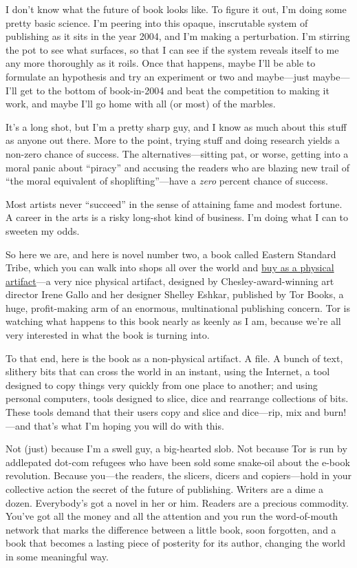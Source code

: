 I don’t know what the future of book looks like. To figure it out,
I’m doing some pretty basic science. I’m peering into this opaque,
inscrutable system of publishing as it sits in the year 2004, and
I’m making a perturbation. I’m stirring the pot to see what
surfaces, so that I can see if the system reveals itself to me any
more thoroughly as it roils. Once that happens, maybe I’ll be able
to formulate an hypothesis and try an experiment or two and
maybe—just maybe—I’ll get to the bottom of book-in-2004 and beat
the competition to making it work, and maybe I’ll go home with all
(or most) of the marbles.

It’s a long shot, but I’m a pretty sharp guy, and I know as much
about this stuff as anyone out there. More to the point, trying
stuff and doing research yields a non-zero chance of success. The
alternatives—sitting pat, or worse, getting into a moral panic
about “piracy” and accusing the readers who are blazing new trail
of “the moral equivalent of shoplifting”—have a \emph{zero} percent
chance of success.

Most artists never “succeed” in the sense of attaining fame and
modest fortune. A career in the arts is a risky long-shot kind of
business. I’m doing what I can to sweeten my odds.

So here we are, and here is novel number two, a book called Eastern
Standard Tribe, which you can walk into shops all over the world
and
\href{http://craphound.com/est/buy.php}{buy as a physical artifact}—a
very nice physical artifact, designed by Chesley-award-winning art
director Irene Gallo and her designer Shelley Eshkar, published by
Tor Books, a huge, profit-making arm of an enormous, multinational
publishing concern. Tor is watching what happens to this book
nearly as keenly as I am, because we’re all very interested in what
the book is turning into.

To that end, here is the book as a non-physical artifact. A file. A
bunch of text, slithery bits that can cross the world in an
instant, using the Internet, a tool designed to copy things very
quickly from one place to another; and using personal computers,
tools designed to slice, dice and rearrange collections of bits.
These tools demand that their users copy and slice and dice—rip,
mix and burn!—and that’s what I’m hoping you will do with this.

Not (just) because I’m a swell guy, a big-hearted slob. Not because
Tor is run by addlepated dot-com refugees who have been sold some
snake-oil about the e-book revolution. Because you—the readers, the
slicers, dicers and copiers—hold in your collective action the
secret of the future of publishing. Writers are a dime a dozen.
Everybody’s got a novel in her or him. Readers are a precious
commodity. You’ve got all the money and all the attention and you
run the word-of-mouth network that marks the difference between a
little book, soon forgotten, and a book that becomes a lasting
piece of posterity for its author, changing the world in some
meaningful way.

